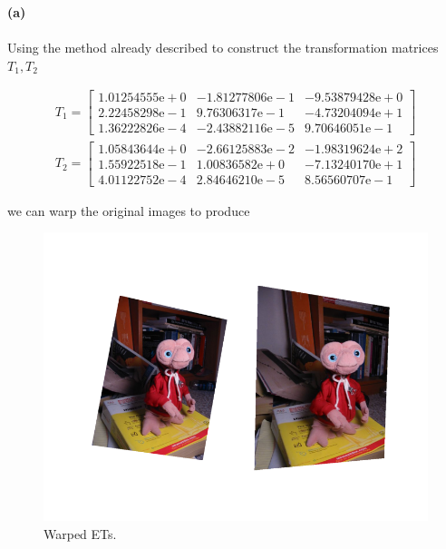 \begin{homeworkProblem}
  \textbf{(a)}
  \\
  \\

  Using the method already described to construct the transformation matrices
  $T_1,T_2$

  \begin{align}
    T_1 = \begin{bmatrix}
      1.01254555\mathrm{e+}0 & -1.81277806\mathrm{e-}1 & -9.53879428\mathrm{e+}0\\
      2.22458298\mathrm{e-}1 & 9.76306317\mathrm{e-}1 & -4.73204094\mathrm{e+}1 \\
      1.36222826\mathrm{e-}4 & -2.43882116\mathrm{e-}5 & 9.70646051\mathrm{e-}1
  \end{bmatrix} \\
    T_2 = \begin{bmatrix}
      1.05843644\mathrm{e+}0 & -2.66125883\mathrm{e-}2 & -1.98319624\mathrm{e+}2\\
      1.55922518\mathrm{e-}1 & 1.00836582\mathrm{e+}0 & -7.13240170\mathrm{e+}1\\
      4.01122752\mathrm{e-}4 & 2.84646210\mathrm{e-}5 & 8.56560707\mathrm{e-}1
    \end{bmatrix}
  \end{align}

  we can warp the original images to produce

  \begin{figure}[H]
      \centering
      \includegraphics[width=1.0\linewidth]{images/warped_ets.png}
      \caption{Warped ETs.}
  \end{figure}


\end{homeworkProblem}
